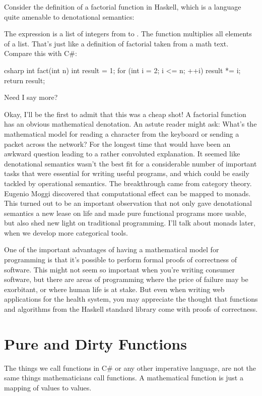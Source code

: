 Consider the definition of a factorial function in Haskell, which is a
language quite amenable to denotational semantics:

The expression \code{{[}1..n{]}} is a list of integers from  to .
The function  multiplies all elements of a list. That's
just like a definition of factorial taken from a math text. Compare this
with C\#:

\begin{snip}{csharp}
int fact(int n) {
    int result = 1;
    for (int i = 2; i <= n; ++i)
        result *= i;
    return result;
}
\end{snip}
Need I say more?

Okay, I'll be the first to admit that this was a cheap shot! A factorial
function has an obvious mathematical denotation. An astute reader might
ask: What's the mathematical model for reading a character from the
keyboard or sending a packet across the network? For the longest time
that would have been an awkward question leading to a rather convoluted
explanation. It seemed like denotational semantics wasn't the best fit
for a considerable number of important tasks that were essential for
writing useful programs, and which could be easily tackled by
operational semantics. The breakthrough came from category theory.
Eugenio Moggi discovered that computational effect can be mapped to
monads. This turned out to be an important observation that not only
gave denotational semantics a new lease on life and made pure functional
programs more usable, but also shed new light on traditional
programming. I'll talk about monads later, when we develop more
categorical tools.

One of the important advantages of having a mathematical model for
programming is that it's possible to perform formal proofs of
correctness of software. This might not seem so important when you're
writing consumer software, but there are areas of programming where the
price of failure may be exorbitant, or where human life is at stake. But
even when writing web applications for the health system, you may
appreciate the thought that functions and algorithms from the Haskell
standard library come with proofs of correctness.

\section{Pure and Dirty Functions}

The things we call functions in C\# or any other imperative language,
are not the same things mathematicians call functions. A mathematical
function is just a mapping of values to values.

